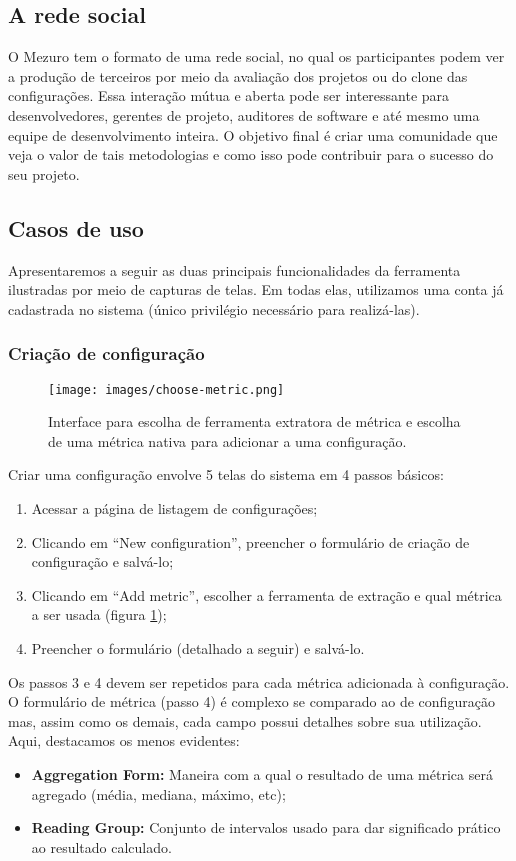 \documentclass[12pt]{article}
\begin{document}
  \subsection{A rede social}\label{sec:user-potencial}
  O Mezuro tem o formato de uma rede social, no qual os participantes podem ver a produção de terceiros por meio da avaliação dos projetos ou do clone das configurações. Essa interação mútua e aberta pode ser interessante para desenvolvedores, gerentes de projeto, auditores de software e até mesmo uma equipe de desenvolvimento inteira. O objetivo final é criar uma comunidade que veja o valor de tais metodologias e como isso pode contribuir para o sucesso do seu projeto.

  \subsection{Casos de uso}
  Apresentaremos a seguir as duas principais funcionalidades da ferramenta ilustradas por meio de capturas de telas. Em todas elas, utilizamos uma conta já cadastrada no sistema (único privilégio necessário para realizá-las).

    \subsubsection{Criação de configuração}
    \begin{figure}[H]
      \centering
      \texttt{[image: images/choose-metric.png]}
      \caption{Interface para escolha de ferramenta extratora de métrica e escolha de uma métrica nativa para adicionar a uma configuração.}
      \label{fig:choose-metric}
    \end{figure}

    Criar uma configuração envolve 5 telas do sistema em 4 passos básicos:
    \begin{enumerate}
      \item Acessar a página de listagem de configurações;
      \item Clicando em ``New configuration'', preencher o formulário de criação de configuração e salvá-lo;
      \item Clicando em ``Add metric'', escolher a ferramenta de extração e qual métrica a ser usada (figura \ref{fig:choose-metric});
      \item Preencher o formulário (detalhado a seguir) e salvá-lo.
    \end{enumerate}

    Os passos 3 e 4 devem ser repetidos para cada métrica adicionada à configuração. O formulário de métrica (passo 4) é complexo se comparado ao de configuração mas, assim como os demais, cada campo possui detalhes sobre sua utilização. Aqui, destacamos os menos evidentes:
    \begin{itemize}
      \item \textbf{Aggregation Form:} Maneira com a qual o resultado de uma métrica será agregado (média, mediana, máximo, etc);
      \item \textbf{Reading Group:} Conjunto de intervalos usado para dar significado prático ao resultado calculado.
    \end{itemize}
\end{document}
